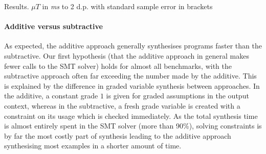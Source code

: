 \begin{table}[t]
\caption{Results. $\mu{T}$ in \emph{ms} to 2 d.p.
with standard sample error in brackets}
\label{tab:results}
\vspace{-2.5em}
\end{table}

%



\paragraph{Additive versus subtractive}
As expected, the additive approach generally synthesises programs faster
than the subtractive. Our first hypothesis (that the additive approach in general
makes fewer calls to the SMT solver) holds for almost all benchmarks, with the
subtractive approach often far exceeding the number made by the additive. This is explained by
the difference in graded variable synthesis between approaches. In the
additive, a constant grade $1$ is given for graded assumptions in the output
context, whereas in the subtractive, a fresh grade
variable is created with a constraint on its usage which
is checked immediately. As the
total synthesis time is almost entirely spent in the SMT solver (more than 90\%), solving constraints is by far the most costly part of synthesis
leading to the additive approach synthesising most examples in a shorter amount of time.

